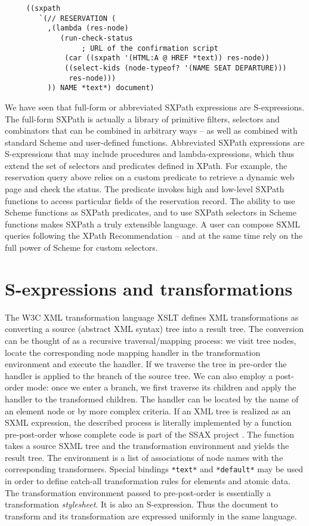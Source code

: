 \documentclass[10pt]{llncs}
\begin{document}
\begin{verbatim}
     ((sxpath
        `(// RESERVATION (
          ,(lambda (res-node)
             (run-check-status
                  ; URL of the confirmation script
              (car ((sxpath '(HTML:A @ HREF *text)) res-node))
              ((select-kids (node-typeof? '(NAME SEAT DEPARTURE)))
               res-node)))
          )) NAME *text*) document)
\end{verbatim}
We have seen that full-form or abbreviated SXPath expressions are
S-expressions. The full-form SXPath is actually a library of primitive
filters, selectors and combinators that can be combined in arbitrary
ways -- as well as combined with standard Scheme and user-defined
functions. Abbreviated SXPath expressions are S-expressions that may
include procedures and lambda-expressions, which thus extend the set
of selectors and predicates defined in XPath. For example, the
reservation query above relies on a custom predicate to retrieve a
dynamic web page and check the status. The predicate invokes high and
low-level SXPath functions to access particular fields of the
reservation record. The ability to use Scheme functions as SXPath
predicates, and to use SXPath selectors in Scheme functions makes
SXPath a truly extensible language. A user can compose SXML queries
following the XPath Recommendation -- and at the same time rely on the
full power of Scheme for custom selectors.

\section{S-expressions and transformations}
The W3C XML transformation language XSLT \cite{XSLT}
defines XML transformations as converting a source (abstract XML
syntax) tree into a result tree. The conversion can be thought of as a
recursive traversal/mapping process: we visit tree nodes, locate the
corresponding node mapping handler in the transformation environment
and execute the handler. If we traverse the tree in pre-order the
handler is applied to the branch of the source tree. We can also
employ a post-order mode: once we enter a branch, we first traverse
its children and apply the handler to the transformed children. The
handler can be located by the name of an element node or by more
complex criteria. If an XML tree is realized as an SXML expression,
the described process is literally implemented by a function
pre-post-order whose complete code is part of the SSAX project \cite{SSAX}. The function takes a source SXML tree and the
transformation environment and yields the result tree. The environment
is a list of associations of node names with the corresponding
transformers. Special bindings \texttt{*text*} and \texttt{*default*} may be used in order to define catch-all transformation
rules for elements and atomic data. The transformation environment
passed to pre-post-order is essentially a transformation \emph{stylesheet}. It is also an S-expression. Thus the document to
transform and its transformation are expressed uniformly in the same
language.
\end{document}
